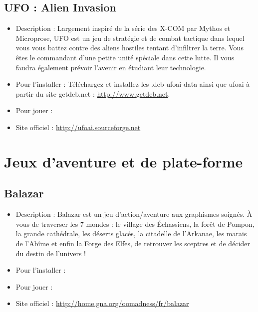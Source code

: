 \subsection{UFO : Alien Invasion}
\begin{itemize}
\begingroup
{}
\item Description : Largement inspiré de la série des X-COM par Mythos et Microprose, UFO est un jeu de stratégie et de combat tactique dans lequel vous vous battez contre des aliens hostiles tentant d'infiltrer la terre. Vous êtes le commandant d'une petite unité spéciale dans cette lutte. Il vous faudra également prévoir l'avenir en étudiant leur technologie.{\par}
\endgroup
\item Pour l'installer : Téléchargez et installez les .deb ufoai-data ainsi que ufoai à partir du site getdeb.net :
\url{http://www.getdeb.net}.{\par}
\item Pour jouer : 
\item Site officiel : \url{http://ufoai.sourceforge.net}{\par}
\end{itemize}
\section{Jeux d'aventure et de plate-forme}
\subsection{Balazar}
\begin{itemize}
\begingroup
{}
\item Description : Balazar est un jeu d'action/aventure aux graphismes soignés. À vous de traverser les 7 mondes : le village des Échassiens, la forêt de Pompon, la grande cathédrale, les déserts glacés, la citadelle de l'Arkanae, les marais de l'Abîme et enfin la Forge des Elfes, de retrouver les sceptres et de décider du destin de l'univers !{\par}
\endgroup
\item Pour l'installer : 
\item Pour jouer : 
\item Site officiel : \url{http://home.gna.org/oomadness/fr/balazar}{\par}
\end{itemize}
\newpage
